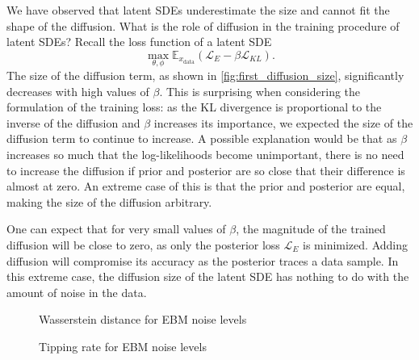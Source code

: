 \documentclass[twoside,11pt]{article}
\begin{document}
We have observed that latent SDEs underestimate the size and cannot fit the shape of the diffusion. What is the role of diffusion in the training procedure of latent SDEs? Recall the loss function of a latent SDE
\[
  \max_{\theta, \phi} \mathbb{E}_{x_{\text{data}}} (\mathcal{L}_E - \beta \mathcal{L}_{KL}).
\]
The size of the diffusion term, as shown in \cref{fig:first_diffusion_size}, significantly decreases with high values of \(\beta\). This is surprising when considering the formulation of the training loss: as the KL divergence is proportional to the inverse of the diffusion and \(\beta\) increases its importance, we expected the size of the diffusion term to continue to increase. A possible explanation would be that as \(\beta\) increases so much that the log-likelihoods become unimportant, there is no need to increase the diffusion if prior and posterior are so close that their difference is almost at zero. An extreme case of this is that the prior and posterior are equal, making the size of the diffusion arbitrary.

One can expect that for very small values of \(\beta\), the magnitude of the trained diffusion will be close to zero, as only the posterior loss \(\mathcal{L}_E\) is minimized. Adding diffusion will compromise its accuracy as the posterior traces a data sample. In this extreme case, the diffusion size of the latent SDE has nothing to do with the amount of noise in the data.

\begin{figure}
    \begin{center}
    
    \end{center}
    \caption{Wasserstein distance for EBM noise levels}
    \label{fig:noise_wasserstein}
\end{figure}

\begin{figure}
    \begin{center}
    
    \end{center}
    \caption{Tipping rate for EBM noise levels}
    \label{fig:noise_tipping_rate}
\end{figure}
\end{document}
